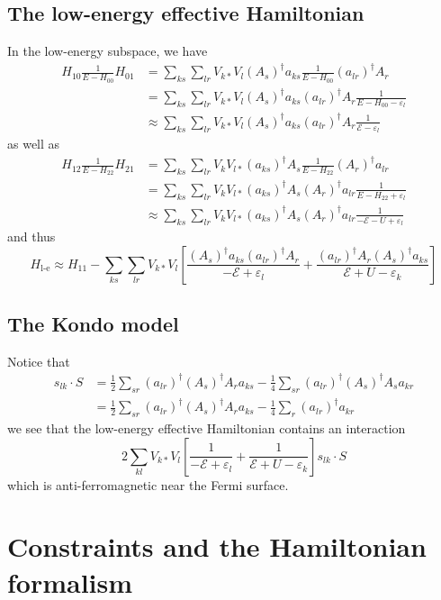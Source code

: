 \documentclass[12pt, oneside]{book}
\begin{document}
\section*{The low-energy effective Hamiltonian}
In the low-energy subspace, we have
\begin{align*}
H_{10}\frac1{E-H_{00}}H_{01}
&=\sum_{ks}\sum_{lr}V_{k*}V_l(A_s)^{\dagger}a_{ks}\frac1{E-H_{00}}(a_{lr})^{\dagger}A_r\\
&=\sum_{ks}\sum_{lr}V_{k*}V_l(A_s)^{\dagger}a_{ks}(a_{lr})^{\dagger}A_r\frac1{E-H_{00}-\varepsilon_l}\\
&\approx\sum_{ks}\sum_{lr}V_{k*}V_l(A_s)^{\dagger}a_{ks}(a_{lr})^{\dagger}A_r\frac1{\mathcal{E}-\varepsilon_l}
\end{align*}
as well as
\begin{align*}
H_{12}\frac1{E-H_{22}}H_{21}
&=\sum_{ks}\sum_{lr}V_kV_{l*}(a_{ks})^{\dagger}A_s\frac1{E-H_{22}}(A_r)^{\dagger}a_{lr}\\
&=\sum_{ks}\sum_{lr}V_kV_{l*}(a_{ks})^{\dagger}A_s(A_r)^{\dagger}a_{lr}\frac1{E-H_{22}+\varepsilon_l}\\
&\approx\sum_{ks}\sum_{lr}V_kV_{l*}(a_{ks})^{\dagger}A_s(A_r)^{\dagger}a_{lr}\frac1{-\mathcal{E}-U+\varepsilon_l}
\end{align*}
and thus
\[
H_{\text{l-e}}\approx H_{11}-\sum_{ks}\sum_{lr}V_{k*}V_l\left[\frac{(A_s)^{\dagger}a_{ks}(a_{lr})^{\dagger}A_r}{-\mathcal{E}+\varepsilon_l}+\frac{(a_{lr})^{\dagger}A_r(A_s)^{\dagger}a_{ks}}{\mathcal{E}+U-\varepsilon_k}\right]
\]

\section*{The Kondo model}
Notice that
\begin{align*}
s_{lk}\cdot S
&=\frac12\sum_{sr}(a_{lr})^{\dagger}(A_s)^{\dagger}A_ra_{ks}-\frac14\sum_{sr}(a_{lr})^{\dagger}(A_s)^{\dagger}A_sa_{kr}\\
&=\frac12\sum_{sr}(a_{lr})^{\dagger}(A_s)^{\dagger}A_ra_{ks}-\frac14\sum_r(a_{lr})^{\dagger}a_{kr}
\end{align*}
we see that the low-energy effective Hamiltonian contains an interaction
\[
2\sum_{kl}V_{k*}V_l\left[\frac1{-\mathcal{E}+\varepsilon_l}+\frac1{\mathcal{E}+U-\varepsilon_k}\right]s_{lk}\cdot S
\]
which is anti-ferromagnetic near the Fermi surface.

\chapter{Constraints and the Hamiltonian formalism}
\end{document}
